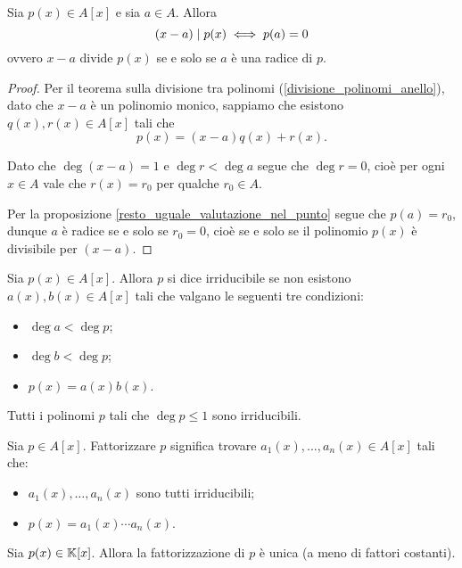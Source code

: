 \begin{theorem}
     \label{th_Ruffini}
    Sia $p(x) \in A[x]$ e sia $a \in A$. Allora \[
        (x - a) \mid p(x) \iff p(a) = 0    
    \] ovvero $x - a$ divide $p(x)$ se e solo se $a$ è una radice di $p$.
\end{theorem}
\begin{proof}
    Per il teorema sulla divisione tra polinomi (\ref{divisione_polinomi_anello}), dato che $x-a$ è un polinomio monico, sappiamo che esistono $q(x), r(x) \in A[x]$ tali che \[
        p(x) = (x-a)q(x) + r(x).
    \]

    Dato che $\deg (x - a) = 1$ e $\deg r < \deg a$ segue che $\deg r = 0$, cioè per ogni $x \in A$ vale che $r(x) = r_0$ per qualche $r_0 \in A$.

    Per la proposizione \ref{resto_uguale_valutazione_nel_punto} segue che $p(a) = r_0$, dunque $a$ è radice se e solo se $r_0 = 0$, cioè se e solo se il polinomio $p(x)$ è divisibile per $(x - a)$.
\end{proof}

\begin{definition}
    Sia $p(x) \in A[x]$. Allora $p$ si dice irriducibile se non esistono $a(x), b(x) \in A[x]$ tali che valgano le seguenti tre condizioni: \begin{itemize}
        \item $\deg a < \deg p$;
        \item $\deg b < \deg p$;
        \item $p(x) = a(x)b(x)$.
    \end{itemize}
\end{definition}

\begin{remark}
    Tutti i polinomi $p$ tali che $\deg p \leq 1$ sono irriducibili.
\end{remark}

\begin{definition}
    Sia $p \in A[x]$. Fattorizzare $p$ significa trovare $a_1(x), \dots, a_n(x) \in A[x]$ tali che: \begin{itemize}
        \item $a_1(x), \dots, a_n(x)$ sono tutti irriducibili;
        \item $p(x) = a_1(x) \cdots a_n(x)$.
    \end{itemize}
\end{definition}

\begin{proposition}
    Sia $p(x) \in \mathbb{K}[x]$. Allora la fattorizzazione di $p$ è unica (a meno di fattori costanti).
\end{proposition}

